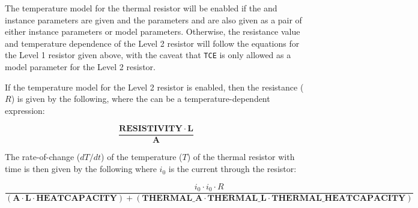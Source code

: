 The temperature model for the thermal resistor will be enabled
if the  and  instance parameters are 
given and the parameters  and
 are also given as a pair of either 
instance parameters or model parameters.  Otherwise, the
resistance value and temperature dependence of the Level 2
resistor will follow the equations for the Level 1 resistor 
given above, with the caveat that \texttt{TCE} is only 
allowed as a model parameter for the Level 2 resistor.

If the temperature model for the Level 2 resistor is enabled,
then the resistance ($R$) is given by the following, where the 
 can be a temperature-dependent expression:

\[
\frac{\mathbf{RESISTIVITY} \cdot \mathbf{L}}
{\mathbf{A}}
\]

The rate-of-change ($dT/dt$) of the temperature ($T$) of the 
thermal resistor with time is then given by the following where 
$i_{0}$ is the current through the resistor:

\[
\frac{i_{0} \cdot i_{0} \cdot R}
{(\mathbf{A} \cdot \mathbf{L} \cdot \mathbf{HEATCAPACITY}) +
 (\mathbf{THERMAL\_A} \cdot \mathbf{THERMAL\_L} \cdot \mathbf{THERMAL\_HEATCAPACITY})}
\]
